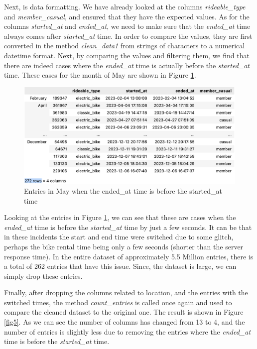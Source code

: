 \documentclass[12pt]{article}
\begin{document}
\begin{itemize}
Next, is data formatting. We have already looked at the columns \textit{rideable\_type} and \textit{member\_casual}, and ensured that they have the expected values. As for the columns \textit{started\_at} and \textit{ended\_at}, we need to make sure that the \textit{ended\_at} time always comes after \textit{started\_at} time. In order to compare the values, they are first converted in the method \textit{clean\_data1} from strings of characters to a numerical datetime format. Next, by comparing the values and filtering them, we find that there are indeed cases where the \textit{ended\_at} time is actually before the \textit{started\_at} time. These cases for the month of May are shown in Figure \ref{fig8}.

	\begin{figure}[h]
	\centering
	\includegraphics[scale=0.56]{imgNEG.png}
	\caption{Entries in May when the ended\_at time is before the started\_at time}
	\label{fig8}
	\end{figure}

Looking at the entries in Figure \ref{fig8}, we can see that these are cases when the \textit{ended\_at} time is before the \textit{started\_at} time by just a few seconds. It can be that in these incidents the start and end time were switched due to some glitch, perhaps the bike rental time being only a few seconds (shorter than the server response time). In the entire dataset of approximately 5.5 Million entries, there is a total of 262 entries that have this issue. Since, the dataset is large, we can simply drop these entries.


Finally, after dropping the columns related to location, and the entries with the switched times, the method \textit{count\_entries} is called once again and used to compare the cleaned dataset to the original one. The result is shown in Figure \ref{fig5}. As we can see the number of columns has changed from 13 to 4, and the number of entries is slightly less due to removing the entries where the \textit{ended\_at} time is before the \textit{started\_at} time. 
	

\end{itemize}
\end{document}

